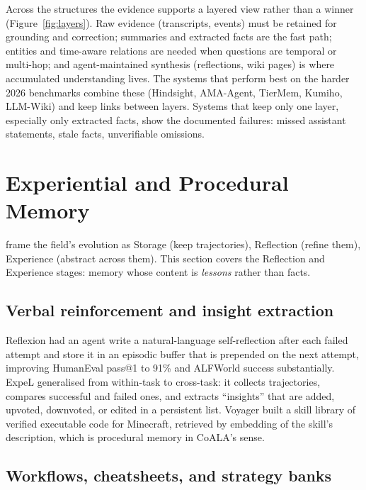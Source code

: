 \documentclass[11pt]{article}
\begin{document}
Across the structures the evidence supports a layered view rather than a winner (Figure~\ref{fig:layers}). Raw evidence (transcripts, events) must be retained for grounding and correction; summaries and extracted facts are the fast path; entities and time-aware relations are needed when questions are temporal or multi-hop; and agent-maintained synthesis (reflections, wiki pages) is where accumulated understanding lives. The systems that perform best on the harder 2026 benchmarks combine these (Hindsight, AMA-Agent, TierMem, Kumiho, LLM-Wiki) and keep links between layers. Systems that keep only one layer, especially only extracted facts, show the documented failures: missed assistant statements, stale facts, unverifiable omissions.

\section{Experiential and Procedural Memory}
\label{sec:experiential}

\citet{luo2026storage} frame the field's evolution as Storage (keep trajectories), Reflection (refine them), Experience (abstract across them). This section covers the Reflection and Experience stages: memory whose content is \emph{lessons} rather than facts.

\subsection{Verbal reinforcement and insight extraction}

Reflexion \citep{shinn2023reflexion} had an agent write a natural-language self-reflection after each failed attempt and store it in an episodic buffer that is prepended on the next attempt, improving HumanEval pass@1 to 91\% and ALFWorld success substantially. ExpeL \citep{zhao2023expel} generalised from within-task to cross-task: it collects trajectories, compares successful and failed ones, and extracts ``insights'' that are added, upvoted, downvoted, or edited in a persistent list. Voyager \citep{wang2023voyager} built a skill library of verified executable code for Minecraft, retrieved by embedding of the skill's description, which is procedural memory in CoALA's sense.

\subsection{Workflows, cheatsheets, and strategy banks}
\end{document}
